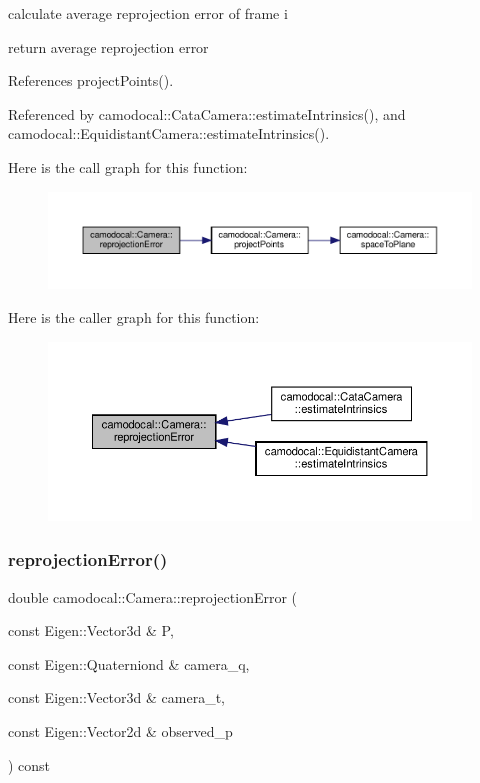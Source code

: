 calculate average reprojection error of frame i

return average reprojection error 

References project\+Points().



Referenced by camodocal\+::\+Cata\+Camera\+::estimate\+Intrinsics(), and camodocal\+::\+Equidistant\+Camera\+::estimate\+Intrinsics().

Here is the call graph for this function\+:\nopagebreak
\begin{figure}[H]
\begin{center}
\leavevmode
\includegraphics[width=350pt]{classcamodocal_1_1Camera_ab162451505d8b9dfda0b96383d597a16_cgraph}
\end{center}
\end{figure}
Here is the caller graph for this function\+:\nopagebreak
\begin{figure}[H]
\begin{center}
\leavevmode
\includegraphics[width=350pt]{classcamodocal_1_1Camera_ab162451505d8b9dfda0b96383d597a16_icgraph}
\end{center}
\end{figure}
\mbox{\label{classcamodocal_1_1Camera_ab261e28c2d056b3149275c01407416a3}} 
\subsubsection{\texorpdfstring{reprojection\+Error()}{reprojectionError()}\hspace{0.1cm}{\footnotesize\ttfamily [2/2]}}
{\footnotesize\ttfamily double camodocal\+::\+Camera\+::reprojection\+Error (\begin{DoxyParamCaption}\item[{const Eigen\+::\+Vector3d \&}]{P,  }\item[{const Eigen\+::\+Quaterniond \&}]{camera\+\_\+q,  }\item[{const Eigen\+::\+Vector3d \&}]{camera\+\_\+t,  }\item[{const Eigen\+::\+Vector2d \&}]{observed\+\_\+p }\end{DoxyParamCaption}) const}



